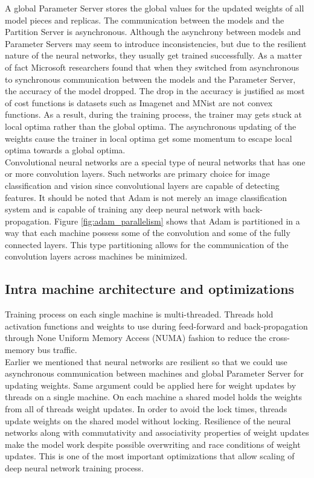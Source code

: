\documentclass[runningheads,a4paper]{llncs}
\begin{document}
A global Parameter Server stores the global values for the updated weights of all model pieces and replicas. The communication between the models and the Partition Server is asynchronous. Although the asynchrony between models and Parameter Servers may seem to introduce inconsistencies, but due to the resilient nature of the neural networks, they usually get trained successfully. As a matter of fact Microsoft researchers found that when they switched from asynchronous to synchronous communication between the models and the Parameter Server, the accuracy of the model dropped. The drop in the accuracy is justified as most of cost functions is datasets such as Imagenet and MNist are not convex functions. As a result, during the training process, the trainer may gets stuck at local optima rather than the global optima. The asynchronous updating of the weights cause the trainer in local optima get some momentum to escape local optima towards a global optima.\\

Convolutional neural networks are a special type of neural networks that has one or more convolution layers. Such networks are primary choice for image classification and vision since convolutional layers are capable of detecting features. It should be noted that Adam is not merely an image classification system and is capable of training any deep neural network with back-propagation. Figure \ref{fig:adam_parallelism} shows that Adam is partitioned in a way that each machine possess some of the convolution and some of the fully connected layers. This type partitioning allows for the communication of the convolution layers across machines be minimized.\\

\subsection*{Intra machine architecture and optimizations}

Training process on each single machine is multi-threaded. Threads hold activation functions and weights to use during feed-forward and back-propagation through None Uniform Memory Access (NUMA) fashion to reduce the cross-memory bus traffic.\\

Earlier we mentioned that neural networks are resilient so that we could use asynchronous communication between machines and global Parameter Server for updating weights. Same argument could be applied here for weight updates by threads on a single machine. On each machine a shared model holds the weights from all of threads weight updates. In order to avoid the lock times, threads update weights on the shared model without locking. Resilience of the neural networks along with commutativity and associativity properties of weight updates make the model work despite possible overwriting and race conditions of weight updates. This is one of the most important optimizations that allow scaling of deep neural network training process.\\
\end{document}
